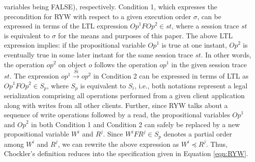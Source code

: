 \documentclass{sig-alternate-05-2015}
\begin{document}
  variables being FALSE), respectively. Condition 1, which expresses the precondition for RYW with respect to
   a given execution order $\sigma$, can be expressed in terms of the LTL expression
    $\mathit{Op}^1 F \mathit{Op}^2 \in \mathit{st}$, where a session trace $\mathit{st}$ is equivalent to $\sigma$ for the
    means and purposes of this paper. The above LTL expression implies: if the propositional variable
    $\mathit{Op}^1$ is true at one instant, $\mathit{Op}^2$ is eventually true in some later instant for the
    same session trace $\mathit{st}$.  In other
     words, the operation $\mathit{op}^2$ on object $o$ follows the operation $\mathit{op}^1$ in the
     given session trace $\mathit{st}$.
   The expression $\mathit{op}^1 \xrightarrow{Si} \mathit{op}^2$ in Condition 2
  can be expressed in terms of LTL as $\mathit{Op}^1 F \mathit{Op}^2 \in S_p$,  where
  $S_p$ is equivalent to $S_i$, i.e., both notations represent a legal serialization comprising all
   operations performed from a given client application along with writes from all other clients.  Further,
   since RYW talks about a sequence of write operations followed by a read, the propositional variables
   $\mathit{Op}^1$ and $\mathit{Op}^2$ in both Condition 1 and Condition 2 can safely be  replaced  by a new propositional variable
   $W^i$ and $R^j$.  Since $W^i F R^j \in S_p$ denotes a partial order among $W^i$ and $R^j$, we can rewrite the above expression as  $W^i \preccurlyeq R^j$. Thus, Chockler's definition reduces into the specification given in Equation \ref{eqn:RYW}. 
\end{document}
